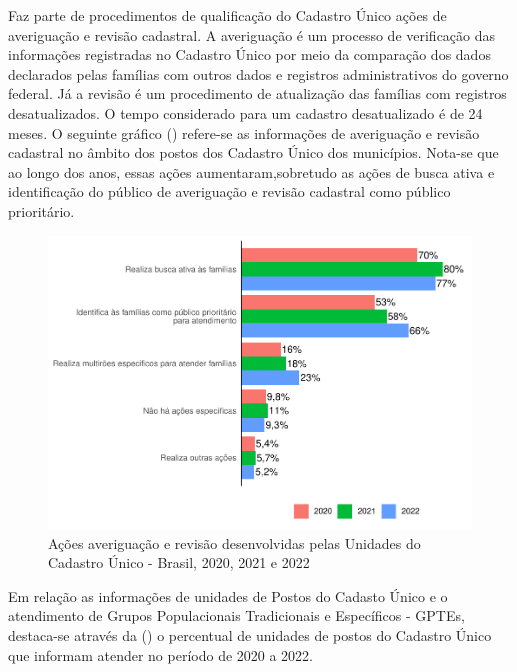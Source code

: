 \documentclass[
  brazilian]{report}
\begin{document}
Faz parte de procedimentos de qualificação do Cadastro Único ações de
averiguação e revisão cadastral. A averiguação é um processo de
verificação das informações registradas no Cadastro Único por meio da
comparação dos dados declarados pelas famílias com outros dados e
registros administrativos do governo federal. Já a revisão é um
procedimento de atualização das famílias com registros desatualizados. O
tempo considerado para um cadastro desatualizado é de 24 meses. O
seguinte gráfico () refere-se as informações de
averiguação e revisão cadastral no âmbito dos postos dos Cadastro Único
dos municípios. Nota-se que ao longo dos anos, essas ações
aumentaram,sobretudo as ações de busca ativa e identificação do público
de averiguação e revisão cadastral como público prioritário.

\begin{figure}
\includegraphics{Censo-SUAS-2022_files/figure-latex/ave_cad-1} \caption[Ações averiguação e revisão desenvolvidas pelas Unidades do Cadastro Único - Brasil, 2020, 2021 e 2022]{Ações averiguação e revisão desenvolvidas pelas Unidades do Cadastro Único - Brasil, 2020, 2021 e 2022}\label{fig:ave_cad}
\end{figure}

Em relação as informações de unidades de Postos do Cadasto Único e o
atendimento de Grupos Populacionais Tradicionais e Específicos - GPTEs,
destaca-se através da () o percentual de
unidades de postos do Cadastro Único que informam atender no período de
2020 a 2022.
\end{document}
